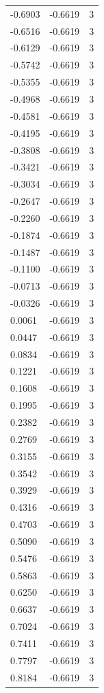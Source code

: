 \begin{longtable}{lrr}
  -0.6903 & -0.6619 & 3 \\
  -0.6516 & -0.6619 & 3 \\
  -0.6129 & -0.6619 & 3 \\
  -0.5742 & -0.6619 & 3 \\
  -0.5355 & -0.6619 & 3 \\
  -0.4968 & -0.6619 & 3 \\
  -0.4581 & -0.6619 & 3 \\
  -0.4195 & -0.6619 & 3 \\
  -0.3808 & -0.6619 & 3 \\
  -0.3421 & -0.6619 & 3 \\
  -0.3034 & -0.6619 & 3 \\
  -0.2647 & -0.6619 & 3 \\
  -0.2260 & -0.6619 & 3 \\
  -0.1874 & -0.6619 & 3 \\
  -0.1487 & -0.6619 & 3 \\
  -0.1100 & -0.6619 & 3 \\
  -0.0713 & -0.6619 & 3 \\
  -0.0326 & -0.6619 & 3 \\
  0.0061 & -0.6619 & 3 \\
  0.0447 & -0.6619 & 3 \\
  0.0834 & -0.6619 & 3 \\
  0.1221 & -0.6619 & 3 \\
  0.1608 & -0.6619 & 3 \\
  0.1995 & -0.6619 & 3 \\
  0.2382 & -0.6619 & 3 \\
  0.2769 & -0.6619 & 3 \\
  0.3155 & -0.6619 & 3 \\
  0.3542 & -0.6619 & 3 \\
  0.3929 & -0.6619 & 3 \\
  0.4316 & -0.6619 & 3 \\
  0.4703 & -0.6619 & 3 \\
  0.5090 & -0.6619 & 3 \\
  0.5476 & -0.6619 & 3 \\
  0.5863 & -0.6619 & 3 \\
  0.6250 & -0.6619 & 3 \\
  0.6637 & -0.6619 & 3 \\
  0.7024 & -0.6619 & 3 \\
  0.7411 & -0.6619 & 3 \\
  0.7797 & -0.6619 & 3 \\
  0.8184 & -0.6619 & 3 \\

\end{longtable}
